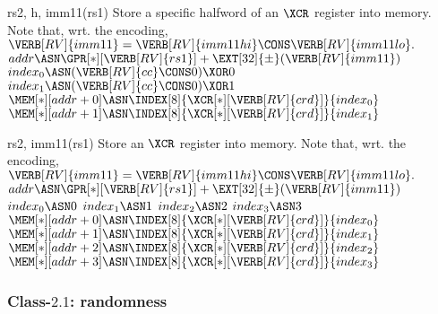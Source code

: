 
 {rs2, h,    imm11(rs1)}{
  Store a specific halfword of an $\XCR$ register into memory.
  Note that, wrt. the encoding,
  $
  \VERB[RV]{imm11} = \VERB[RV]{imm11hi} \CONS \VERB[RV]{imm11lo} .
  $
}{
  $addr            \ASN \GPR[*][{\VERB[RV]{rs1}}] + \EXT[32]{\pm}( \VERB[RV]{imm11} )$ \;
  $index_0         \ASN ( \VERB[RV]{cc} \CONS             0 ) \XOR 0$ \;
  $index_1         \ASN ( \VERB[RV]{cc} \CONS             0 ) \XOR 1$ \;
  $\MEM[*][addr+0] \ASN \INDEX[8]{\XCR[*][{\VERB[RV]{crd}}]}{index_0}$ \;
  $\MEM[*][addr+1] \ASN \INDEX[8]{\XCR[*][{\VERB[RV]{crd}}]}{index_1}$ \;
}


 {rs2,       imm11(rs1)}{
  Store                        an $\XCR$ register into memory.
  Note that, wrt. the encoding,
  $
  \VERB[RV]{imm11} = \VERB[RV]{imm11hi} \CONS \VERB[RV]{imm11lo} .
  $
}{
  $addr            \ASN \GPR[*][{\VERB[RV]{rs1}}] + \EXT[32]{\pm}( \VERB[RV]{imm11} )$ \;
  $index_0         \ASN                                            0$ \;
  $index_1         \ASN                                            1$ \;
  $index_2         \ASN                                            2$ \;
  $index_3         \ASN                                            3$ \;
  $\MEM[*][addr+0] \ASN \INDEX[8]{\XCR[*][{\VERB[RV]{crd}}]}{index_0}$ \;
  $\MEM[*][addr+1] \ASN \INDEX[8]{\XCR[*][{\VERB[RV]{crd}}]}{index_1}$ \;
  $\MEM[*][addr+2] \ASN \INDEX[8]{\XCR[*][{\VERB[RV]{crd}}]}{index_2}$ \;
  $\MEM[*][addr+3] \ASN \INDEX[8]{\XCR[*][{\VERB[RV]{crd}}]}{index_3}$ \;
}


\subsubsection{Class-$2.1$: randomness}
\label{sec:spec:instruction:2:1}


